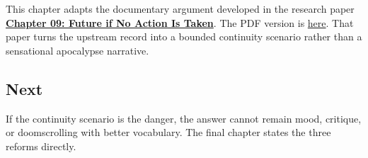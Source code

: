 \documentclass[
  american,
  12pt,
  letterpaper,
]{article}
\begin{document}
This chapter adapts the documentary argument developed in the research
paper
\href{../../papers/html/09_future-if-unchecked_paper.html}{\textbf{Chapter
09: Future if No Action Is Taken}}. The PDF version is
\href{../../papers/pdf/09_future-if-unchecked_paper/09_future-if-unchecked_paper.pdf}{here}.
That paper turns the upstream record into a bounded continuity scenario
rather than a sensational apocalypse narrative.

\subsection{Next}\label{next}

If the continuity scenario is the danger, the answer cannot remain mood,
critique, or doomscrolling with better vocabulary. The final chapter
states the three reforms directly.
\end{document}
